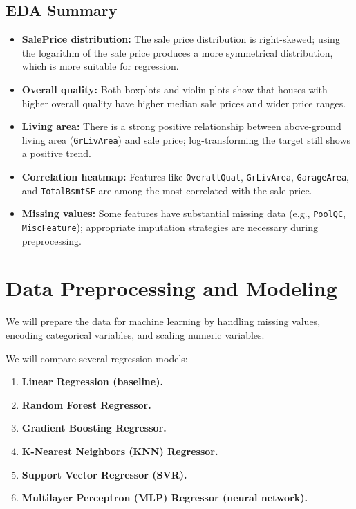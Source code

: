 \documentclass[
]{article}
\providecommand{\tightlist}{%
  \setlength{\itemsep}{0pt}\setlength{\parskip}{0pt}}
\begin{document}
\subsection{EDA Summary}\label{eda-summary}

\begin{itemize}
\tightlist
\item
  \textbf{SalePrice distribution:} The sale price distribution is
  right-skewed; using the logarithm of the sale price produces a more
  symmetrical distribution, which is more suitable for regression.\\
\item
  \textbf{Overall quality:} Both boxplots and violin plots show that
  houses with higher overall quality have higher median sale prices and
  wider price ranges.\\
\item
  \textbf{Living area:} There is a strong positive relationship between
  above-ground living area (\texttt{GrLivArea}) and sale price;
  log-transforming the target still shows a positive trend.\\
\item
  \textbf{Correlation heatmap:} Features like \texttt{OverallQual},
  \texttt{GrLivArea}, \texttt{GarageArea}, and \texttt{TotalBsmtSF} are
  among the most correlated with the sale price.\\
\item
  \textbf{Missing values:} Some features have substantial missing data
  (e.g., \texttt{PoolQC}, \texttt{MiscFeature}); appropriate imputation
  strategies are necessary during preprocessing.
\end{itemize}

\section{Data Preprocessing and
Modeling}\label{data-preprocessing-and-modeling}

We will prepare the data for machine learning by handling missing
values, encoding categorical variables, and scaling numeric variables.

We will compare several regression models:

\begin{enumerate}
\def\labelenumi{\arabic{enumi}.}
\tightlist
\item
  \textbf{Linear Regression (baseline).}
\item
  \textbf{Random Forest Regressor.}
\item
  \textbf{Gradient Boosting Regressor.}
\item
  \textbf{K-Nearest Neighbors (KNN) Regressor.}
\item
  \textbf{Support Vector Regressor (SVR).}
\item
  \textbf{Multilayer Perceptron (MLP) Regressor (neural network).}
\end{enumerate}
\end{document}
